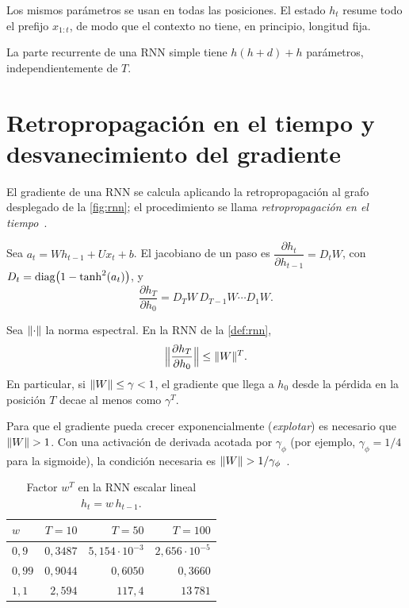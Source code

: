 Los mismos parámetros se usan en todas las posiciones. El estado $h_t$ resume todo el prefijo $x_{1:t}$, de modo que el contexto no tiene, en principio, longitud fija.

\begin{proposicion}\label{prop:param-rnn}
La parte recurrente de una RNN simple tiene $h(h+d)+h$ parámetros, independientemente de $T$.
\end{proposicion}

\addtocounter{figure}{1}%

\section{Retropropagación en el tiempo y desvanecimiento del gradiente}

El gradiente de una RNN se calcula aplicando la retropropagación al grafo desplegado de la \cref{fig:rnn}; el procedimiento se llama \emph{retropropagación en el tiempo}~\cite[§9.7]{d2l}.

\begin{lema}\label{lem:jacobiano}
Sea $a_t=W h_{t-1}+U x_t+b$. El jacobiano de un paso es $\dfrac{\partial h_t}{\partial h_{t-1}}=D_t W$, con $D_t=\operatorname{diag}\bigl(1-\tanh^{2}(a_t)\bigr)$, y
\[
\frac{\partial h_T}{\partial h_0}=D_T W\,D_{T-1}W\cdots D_1 W.
\]
\end{lema}

\begin{teorema}\label{teo:desvanece}
Sea $\lVert\cdot\rVert$ la norma espectral. En la RNN de la \cref{def:rnn},
\[
\Bigl\lVert\frac{\partial h_T}{\partial h_0}\Bigr\rVert\le\lVert W\rVert^{T}.
\]
En particular, si $\lVert W\rVert\le\gamma<1$, el gradiente que llega a $h_0$ desde la pérdida en la posición $T$ decae al menos como $\gamma^{T}$.
\end{teorema}

\begin{corolario}\label{cor:explota}
Para que el gradiente pueda crecer exponencialmente (\emph{explotar}) es necesario que $\lVert W\rVert>1$. Con una activación de derivada acotada por $\gamma_{\phi}$ (por ejemplo, $\gamma_{\phi}=1/4$ para la sigmoide), la condición necesaria es $\lVert W\rVert>1/\gamma_{\phi}$~\cite[§2.1]{pascanu}.
\end{corolario}

\begin{table}[h]
\centering\small
\caption{Factor $w^{T}$ en la RNN escalar lineal $h_t=w\,h_{t-1}$.}\label{tab:wT}
\begin{tabular}{@{}lrrr@{}}
\toprule
$w$ & $T=10$ & $T=50$ & $T=100$ \\
\midrule
$0{,}9$ & $0{,}3487$ & $5{,}154\cdot 10^{-3}$ & $2{,}656\cdot 10^{-5}$ \\
$0{,}99$ & $0{,}9044$ & $0{,}6050$ & $0{,}3660$ \\
$1{,}1$ & $2{,}594$ & $117{,}4$ & $13\,781$ \\
\bottomrule
\end{tabular}
\end{table}

